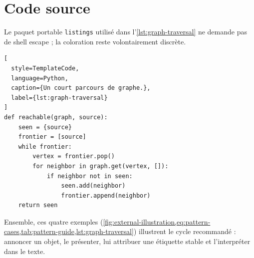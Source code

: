 
\clearpage
\section{Code source}

Le paquet portable \texttt{listings} utilisé dans l'\cref{lst:graph-traversal}
ne demande pas de shell escape ; la coloration reste volontairement discrète.

% 
\begin{lstlisting}[
  style=TemplateCode,
  language=Python,
  caption={Un court parcours de graphe.},
  label={lst:graph-traversal}
]
def reachable(graph, source):
    seen = {source}
    frontier = [source]
    while frontier:
        vertex = frontier.pop()
        for neighbor in graph.get(vertex, []):
            if neighbor not in seen:
                seen.add(neighbor)
                frontier.append(neighbor)
    return seen
\end{lstlisting}

Ensemble, ces quatre exemples
(\cref{fig:external-illustration,eq:pattern-cases,tab:pattern-guide,lst:graph-traversal})
illustrent le cycle recommandé : annoncer un objet, le présenter, lui attribuer
une étiquette stable et l'interpréter dans le texte.
